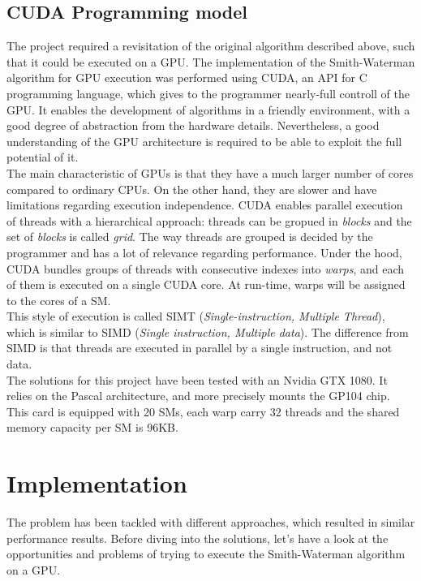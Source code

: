 \documentclass{article}
\begin{document}
\subsection{CUDA Programming model}
The project required a revisitation of the original algorithm described above, such that it could be executed on a GPU. The implementation of the Smith-Waterman algorithm for GPU execution was performed using CUDA, an API for C programming language, which gives to the programmer nearly-full controll of the GPU. It enables the development of algorithms in a friendly environment, with a good degree of abstraction from the hardware details. Nevertheless, a good understanding of the GPU architecture is required to be able to exploit the full potential of it.\\
The main characteristic of GPUs is that they have a much larger number of cores compared to ordinary CPUs. On the other hand, they are slower and have limitations regarding execution independence.
CUDA enables parallel execution of threads with a hierarchical approach: threads can be gropued in \textit{blocks} and the set of \textit{blocks} is called \textit{grid}. The way threads are grouped is decided by the programmer and has a lot of relevance regarding performance. 
Under the hood, CUDA bundles groups of threads with consecutive indexes into \textit{warps}, and each of them is executed on a single CUDA core. At run-time, warps will be assigned to the cores of a SM.\\
This style of execution is called SIMT (\textit{Single-instruction, Multiple Thread}), which is similar to SIMD (\textit{Single instruction, Multiple data}). The difference from SIMD is that threads are executed in parallel by a single instruction, and not data.\\
The solutions for this project have been tested with an Nvidia GTX 1080. It relies on the Pascal architecture, and more precisely mounts the GP104 chip. This card is equipped with 20 SMs, each warp carry 32 threads and the shared memory capacity per SM is 96KB.


\section{Implementation}\label{implementation}
The problem has been tackled with different approaches, which resulted in similar performance results. Before diving into the solutions, let's have a look at the opportunities and problems of trying to execute the Smith-Waterman algorithm on a GPU.\\
\end{document}
